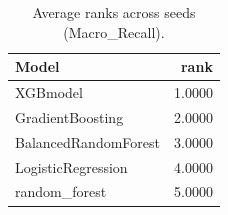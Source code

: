 \begin{table}[t]
\centering
\begin{tabular}{lr}
\toprule
Model & rank \\
\midrule
XGBmodel & 1.0000 \\
GradientBoosting & 2.0000 \\
BalancedRandomForest & 3.0000 \\
LogisticRegression & 4.0000 \\
random_forest & 5.0000 \\
\bottomrule
\end{tabular}
\caption{Average ranks across seeds (Macro_Recall).}
\label{tab:avg_rank_Macro_Recall}
\end{table}